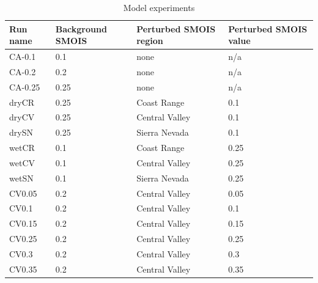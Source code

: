 \begin{table}
\begin{tabular}{l l l l}
\hline
Run name & Background SMOIS & Perturbed SMOIS region & Perturbed SMOIS value \\
\hline
CA-0.1 & 0.1 & none & n/a \\
CA-0.2 & 0.2 & none & n/a \\
CA-0.25 & 0.25 & none & n/a \\
dryCR & 0.25 & Coast Range & 0.1 \\
dryCV & 0.25 & Central Valley & 0.1 \\
drySN & 0.25 & Sierra Nevada & 0.1 \\
wetCR & 0.1 & Coast Range & 0.25 \\
wetCV & 0.1 & Central Valley & 0.25 \\
wetSN & 0.1 & Sierra Nevada & 0.25 \\
CV0.05 & 0.2 & Central Valley & 0.05 \\
CV0.1 & 0.2 & Central Valley & 0.1 \\
CV0.15 & 0.2 & Central Valley & 0.15 \\
CV0.25 & 0.2 & Central Valley & 0.25 \\
CV0.3 & 0.2 & Central Valley & 0.3 \\
CV0.35 & 0.2 & Central Valley & 0.35 \\
\hline
\end{tabular}
\caption{Model experiments}
\label{table:windSol_runlist}
\end{table}

%
